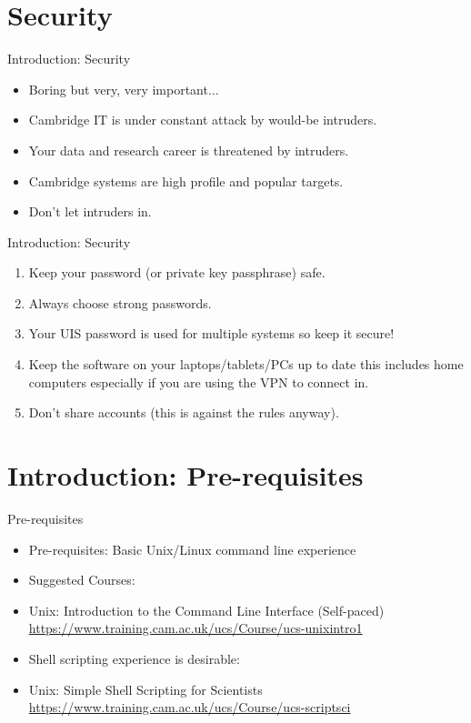 \section{Security}
\begin{frame}{Introduction: Security}
\begin{itemize}
\item{\alert{Boring but very, very important${}\ldots$}}
\pause
\item{Cambridge IT is under constant attack by would-be intruders.}
\pause
\item{Your data and research career is threatened by intruders.}
\pause
\item{\alert{Cambridge systems} are high profile and popular targets.}
\pause
\item{\alert{Don't let intruders in.}}
\end{itemize}
\end{frame}

\begin{frame}{Introduction: Security}
\begin{enumerate}
\item{\alert{Keep your password (or private key passphrase) safe.}}
\pause
\item{\alert{Always choose strong passwords.}}
\pause
\item{\alert{Your UIS password is used for multiple systems so keep it secure!}}
\pause
\item{Keep the software on your laptops/tablets/PCs up to date this includes home computers especially if you are using the VPN to connect in.}
\pause
\item{Don't share accounts (this is against the rules anyway).}
\end{enumerate}
\end{frame}

\section{Introduction: Pre-requisites}
\begin{frame}{Pre-requisites}
\begin{itemize}
\item{Pre-requisites: Basic Unix/Linux command line experience}
\pause
\item{Suggested Courses:}
\item Unix: Introduction to the Command Line Interface (Self-paced)
\small {\url{https://www.training.cam.ac.uk/ucs/Course/ucs-unixintro1}} 
\pause
\item Shell scripting experience is desirable:
\item Unix: Simple Shell Scripting for Scientists
\small {\url{https://www.training.cam.ac.uk/ucs/Course/ucs-scriptsci}} 
\end{itemize}
\end{frame}

